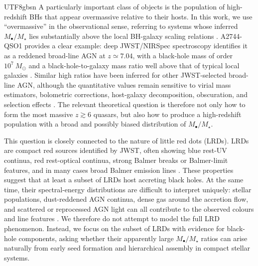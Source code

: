 \documentclass[trackchanges, twocolappendix, twocolumn]{aastex701}
\begin{document}
\begin{CJK*}{UTF8}{gbsn}
A particularly important class of objects is the population of high-redshift BHs that appear overmassive relative to their hosts. In this work, we use ``overmassive'' in the observational sense, referring to systems whose inferred $M_{\bullet} / M_\star$ lies substantially above the local BH-galaxy scaling relations \citep[e.g.,][]{KormendyHo2013, ReinesVolonteri2015}. A2744-QSO1 provides a clear example: deep JWST/NIRSpec spectroscopy identifies it as a reddened broad-line AGN at $z \simeq 7.04$, with a black-hole mass of order $10^7~M_\odot$ and a black-hole-to-galaxy mass ratio well above that of typical local galaxies \citep{Furtak+2024A2744QSO1}. Similar high ratios have been inferred for other JWST-selected broad-line AGN, although the quantitative values remain sensitive to virial mass estimators, bolometric corrections, host-galaxy decomposition, obscuration, and selection effects \citep{Pacucci+2023, Harikane+2023, Greene+2024}. The relevant theoretical question is therefore not only how to form the most massive $z \gtrsim 6$ quasars, but also how to produce a high-redshift population with a broad and possibly biased distribution of $M_{\bullet}/M_\star$.

This question is closely connected to the nature of little red dots (LRDs). LRDs are compact red sources identified by JWST, often showing blue rest-UV continua, red rest-optical continua, strong Balmer breaks or Balmer-limit features, and in many cases broad Balmer emission lines \citep{Labbe+2023, Matthee+2024, Kocevski+2024, Greene+2024}. These properties suggest that at least a subset of LRDs host accreting black holes. At the same time, their spectral-energy distributions are difficult to interpret uniquely: stellar populations, dust-reddened AGN continua, dense gas around the accretion flow, and scattered or reprocessed AGN light can all contribute to the observed colours and line features \citep{Setton+2024, InayoshiMaiolino2025, Brooks+2024}. We therefore do not attempt to model the full LRD phenomenon. Instead, we focus on the subset of LRDs with evidence for black-hole components, asking whether their apparently large $M_{\bullet}/M_\star$ ratios can arise naturally from early seed formation and hierarchical assembly in compact stellar systems.


\end{CJK*}
\end{document}
